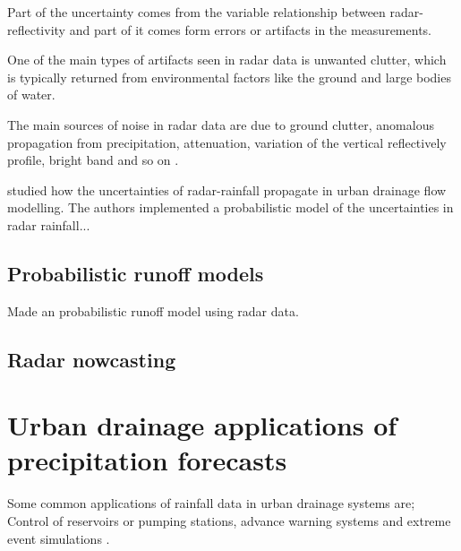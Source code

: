 Part of the uncertainty comes from the variable relationship between radar-reflectivity and part of it comes form errors or artifacts in the measurements. 

One of the main types of artifacts seen in radar data is unwanted clutter, which is typically returned from environmental factors like the ground and large bodies of water. 


The main sources of noise in radar data are due to ground clutter, anomalous propagation from precipitation, attenuation, variation of the vertical reflectively profile, bright band and so on \cite{RICORAMIREZ201517}\cite{RICORAMIREZ201517}.


\cite{RICORAMIREZ201517} studied how the uncertainties of radar-rainfall propagate in urban drainage flow modelling. The authors implemented a probabilistic model of the uncertainties in radar rainfall...


\cite{KRAJEWSKI20021387} 


\subsection{Probabilistic runoff models}
\cite{LOWE2014397} Made an probabilistic runoff model using radar data. 

\subsection{Radar nowcasting}
 

\section{Urban drainage applications of precipitation forecasts}
Some common applications of rainfall data in urban drainage systems  are; Control of reservoirs or pumping stations, advance warning systems and extreme event simulations \cite{RN301}. 

